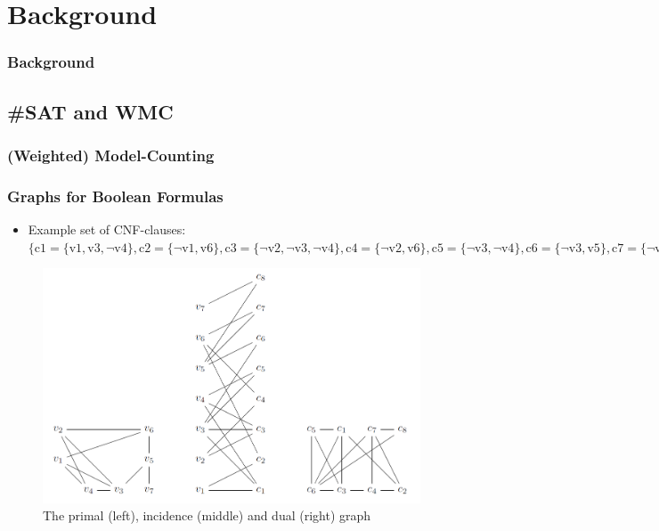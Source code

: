 \documentclass[c,8pt,xcolor...,x11names]{beamer}
\begin{document}
\section{Background}
\begin{frame}
	\frametitle{Background}

\end{frame}

\subsection{\#SAT and WMC}
\begin{frame}
	\frametitle{(Weighted) Model-Counting}
\end{frame}

\begin{frame}
	\frametitle{Graphs for Boolean Formulas}
	\smallskip
	\begin{itemize}
		\item {\color{blue} Example set of CNF-clauses:}\smallskip\\
		{\tiny $\{\text{c1}=\{\text{v1},\text{v3},\neg \text{v4}\},\text{c2}=\{\neg \text{v1},\text{v6}\},\text{c3}=\{\neg \text{v2},\neg \text{v3},\neg \text{v4}\},\text{c4}=\{\neg \text{v2},\text{v6}\},\text{c5}=\{\neg \text{v3},\neg \text{v4}\},\text{c6}=\{\neg \text{v3},\text{v5}\},\text{c7}=\{\neg \text{v5},\neg \text{v6}\},\text{c8}=\{\text{v5},\text{v7}\}\}
			$
		}
	\end{itemize}
	\begin{figure}
		\includegraphics[height=0.5\textheight]{images/DAGraphs.png}
		\caption{The primal (left), incidence (middle) and dual (right) graph}
	\end{figure}
	
\end{frame}
\end{document}
